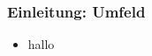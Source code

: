 

\usebackgroundtemplate{}
\begin{frame}[plain]
	\titlepage
	\hfill
	\begin{center}
	\end{center}
\end{frame}


\begin{frame}\frametitle{Einleitung: Umfeld}
 \begin{itemize}
  \item hallo
 \end{itemize}

\end{frame}






